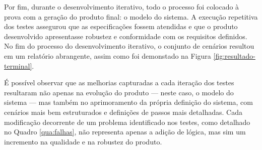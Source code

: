 Por fim, durante o desenvolvimento iterativo, todo o processo foi colocado à prova com a geração do produto final: o modelo do sistema. A execução repetitiva dos 
testes assegurou que as especificações fossem atendidas e que o produto desenvolvido apresentasse robustez e conformidade com os requisitos definidos. No fim do 
processo do desenvolvimento iterativo, o conjunto de cenários resultou em um relatório abrangente, assim como foi demonstado na Figura \ref{fig:resultado-terminal}.

É possível observar que as melhorias capturadas a cada iteração dos testes resultaram não apenas na evolução do produto — neste caso, o modelo do sistema — mas também 
no aprimoramento da própria definição do sistema, com cenários mais bem estruturados e definições de passos mais detalhadas. Cada modificação decorrente de um problema 
identificado nos testes, como detalhado no Quadro \ref{qua:falhas}, não representa apenas a adição de lógica, mas sim um incremento na qualidade e na robustez do produto.





